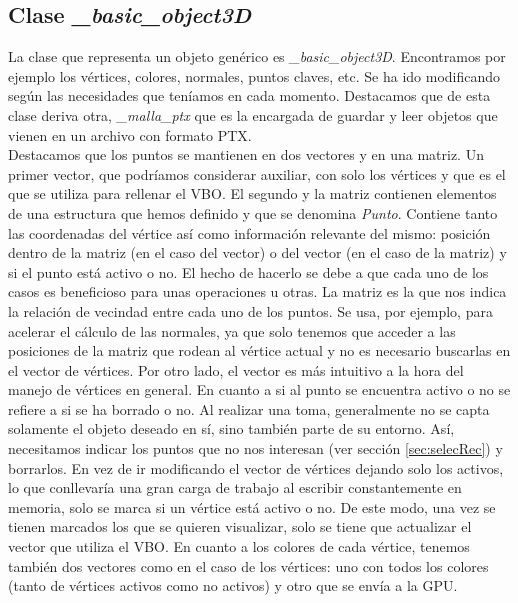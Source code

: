 \subsection{Clase \textit{\_basic\_object3D}}
La clase que representa un objeto genérico es \textit{\_basic\_object3D}. Encontramos por ejemplo los vértices, colores, normales, puntos claves, etc. Se ha ido modificando según las necesidades que teníamos en cada momento. Destacamos que de esta clase deriva otra, \textit{\_malla\_ptx} que es la encargada de guardar y leer objetos que vienen en un archivo con formato PTX. \\

Destacamos que los puntos se mantienen en dos vectores y en una matriz. Un primer vector, que podríamos considerar auxiliar, con solo los vértices y que es el que se utiliza para rellenar el VBO. El segundo y la matriz contienen elementos de una estructura que hemos definido y que se denomina \textit{Punto}. Contiene tanto las coordenadas del vértice así como información relevante del mismo: posición dentro de la matriz (en el caso del vector) o del vector (en el caso de la matriz) y si el punto está activo o no. El hecho de hacerlo se debe a que cada uno de los casos es beneficioso para unas operaciones u otras. La matriz es la que nos indica la relación de vecindad entre cada uno de los puntos. Se usa, por ejemplo, para acelerar el cálculo de las normales, ya que solo tenemos que acceder a las posiciones de la matriz que rodean al vértice actual y no es necesario buscarlas en el vector de vértices. Por otro lado, el vector es más intuitivo a la hora del manejo de vértices en general. En cuanto a si al punto se encuentra activo o no se refiere a si se ha borrado o no. Al realizar una toma, generalmente no se capta solamente el objeto deseado en sí, sino también parte de su entorno. Así, necesitamos indicar los puntos que no nos interesan (ver sección \ref{sec:selecRec}) y borrarlos. En vez de ir modificando el vector de vértices dejando solo los activos, lo que conllevaría una gran carga de trabajo al escribir constantemente en memoria, solo se marca si un vértice está activo o no. De este modo, una vez se tienen marcados los que se quieren visualizar, solo se tiene que actualizar el vector que utiliza el VBO. En cuanto a los colores de cada vértice, tenemos también dos vectores como en el caso de los vértices: uno con todos los colores (tanto de vértices activos como no activos) y otro que se envía a la GPU.\\


